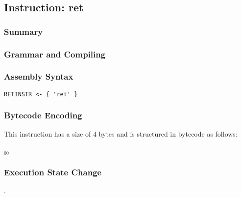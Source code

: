 \subsection{Instruction: ret}

\subsubsection{Summary}


\subsubsection{Grammar and Compiling}


\subsubsection{Assembly Syntax}

\begin{myquote}
\begin{verbatim}
RETINSTR <- { 'ret' }
\end{verbatim}
\end{myquote}


\subsubsection{Bytecode Encoding}

This instruction has a size of 4 bytes and is structured in bytecode as follows:

$_{00}$\ 


\subsubsection{Execution State Change}

.


